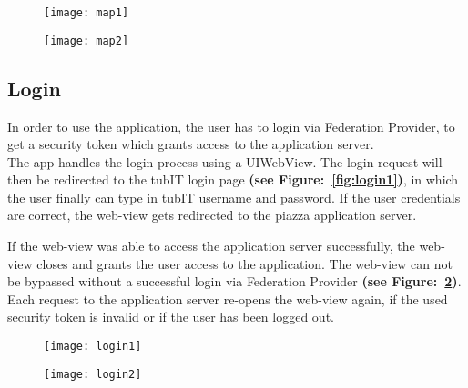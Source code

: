 \begin{figure}
\centering
\begin{minipage}{.5\textwidth}
  \centering
  \texttt{[image: map1]}
  \label{fig:map1}
\end{minipage}%
\begin{minipage}{.5\textwidth}
  \centering
  \texttt{[image: map2]}
  \label{fig:map2}
\end{minipage}
\end{figure}


\subsection{Login}

In order to use the application, the user has to login via Federation Provider, to get
a security token which grants access to the application server. \\

The app handles the login process using a UIWebView. The login request will then be redirected
to the tubIT login page \textbf{(see Figure:~\ref{fig:login1})}, in which the user finally can type in tubIT username and password.
If the user credentials are correct, the web-view gets redirected to the piazza application server.

If the web-view was able to access the application server successfully, the web-view closes and grants the user access to the application. The web-view can not be bypassed without a successful login via Federation Provider \textbf{(see Figure:~\ref{fig:login2})}. Each request to the application server re-opens the web-view again, if the used security token is invalid or if the user has been logged out.


\begin{figure}
\centering
\begin{minipage}{.5\textwidth}
  \centering
  \texttt{[image: login1]}
  \label{fig:login1}
\end{minipage}%
\begin{minipage}{.5\textwidth}
  \centering
  \texttt{[image: login2]}
  \label{fig:login2}
\end{minipage}
\end{figure}

